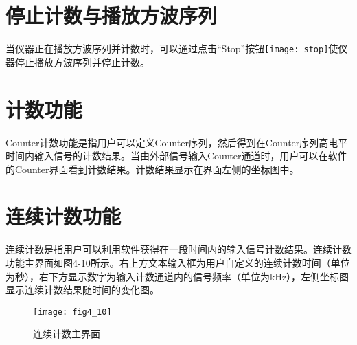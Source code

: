 \section{\heiti 停止计数与播放方波序列}
当仪器正在播放方波序列并计数时，可以通过点击“Stop”按钮\texttt{[image: stop]}使仪器停止播放方波序列并停止计数。

\section{\heiti 计数功能}
Counter计数功能是指用户可以定义Counter序列，然后得到在Counter序列高电平时间内输入信号的计数结果。当由外部信号输入Counter通道时，用户可以在软件的Counter界面看到计数结果。计数结果显示在界面左侧的坐标图中。

\section{\heiti 连续计数功能}
连续计数是指用户可以利用软件获得在一段时间内的输入信号计数结果。连续计数功能主界面如图4-10所示。右上方文本输入框为用户自定义的连续计数时间（单位为秒），右下方显示数字为输入计数通道内的信号频率（单位为kHz），左侧坐标图显示连续计数结果随时间的变化图。
\begin{figure}[ht]
\centering
\texttt{[image: fig4\_10]}
\caption{连续计数主界面}
\end{figure}

